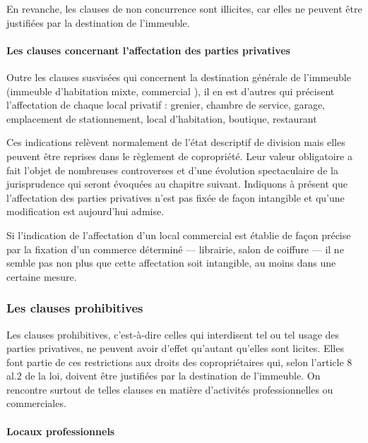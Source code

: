 				En revanche, les clauses de non concurrence sont illicites, car elles ne peuvent être justifiées par la destination de l’immeuble.
				
			\paragraph{Les clauses concernant l'affectation des parties privatives }
				
				Outre les clauses susvisées qui concernent la destination générale de l'immeuble (immeuble d'habitation mixte, commercial \etc), il en est d'autres qui précisent l'affectation de chaque local privatif : grenier, chambre de service, garage, emplacement de stationnement, local d'habitation, boutique, restaurant \etc
				
				Ces indications relèvent normalement de l'état descriptif de division mais elles peuvent être reprises dans le règlement de copropriété. Leur valeur obligatoire a fait l'objet de nombreuses controverses et d'une évolution spectaculaire de la jurisprudence qui seront évoquées au chapitre suivant. Indiquons à présent que l'affectation des parties privatives n'est pas fixée de façon intangible et qu'une modification est aujourd'hui admise.
				
				Si l'indication de l'affectation d'un local commercial est établie de façon précise par la fixation d'un commerce déterminé --- librairie, salon de coiffure --- il ne semble pas non plus que cette affectation soit intangible, au moins dans une certaine mesure.
		
		\subsubsection{Les clauses prohibitives}\label{07_II_B_2}
		
			Les clauses prohibitives, c'est-à-dire celles qui interdisent tel ou tel usage des parties privatives, ne peuvent avoir d'effet qu'autant qu'elles sont licites. Elles font partie de ces restrictions aux droits des copropriétaires qui, selon l'article 8 al.2 de la loi, doivent être justifiées par la destination de l'immeuble.
			On rencontre surtout de telles clauses en matière d'activités professionnelles ou commerciales.
			
			\paragraph{Locaux professionnels}
			
